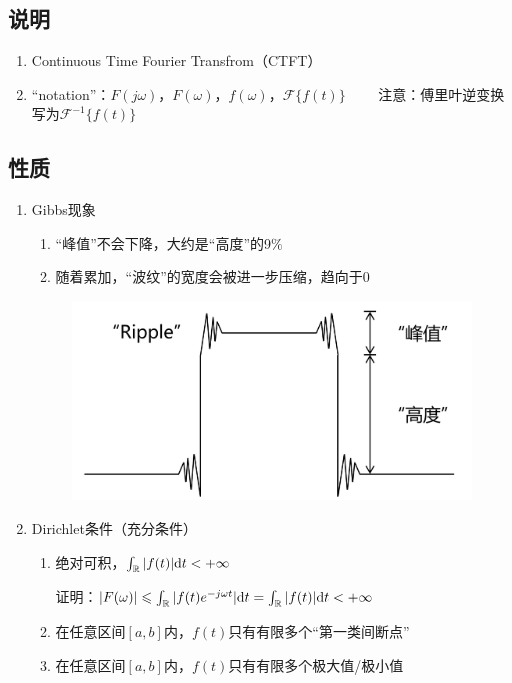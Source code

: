 \documentclass[UTF8]{ctexart}
\begin{document}
\subsection{说明}
\begin{enumerate}[label=(\arabic*),itemindent=0pt,labelindent=\parindent,labelwidth=2em,labelsep=5pt,leftmargin=*]
    \item Continuous Time Fourier Transfrom（CTFT）
    \item “notation”：$F(j\omega)$，$F(\omega)$，$\hat{f}(\omega)$，$\mathscr{F}\{f(t)\}\qquad$
          注意：傅里叶逆变换写为$\mathscr{F}^{-1}\{f(t)\}$
\end{enumerate}\par

\subsection{性质}
\begin{enumerate}[label=(\arabic*),itemindent=0pt,labelindent=\parindent,labelwidth=2em,labelsep=5pt,leftmargin=*]
    \item Gibbs现象
          \begin{enumerate}[label=\textcircled{\arabic*}]
            \item “峰值”不会下降，大约是“高度”的9$\%$
            \item 随着累加，“波纹”的宽度会被进一步压缩，趋向于0
          \end{enumerate}
          \begin{figure}[h]
            \centering
            \includegraphics[scale=0.35]{Gibbs.png}
          \end{figure}
    \item Dirichlet条件（充分条件）
          \begin{enumerate}[label=\textcircled{\arabic*}]
            \item 绝对可积，$\int_{\mathbb{R}}|f(t)|{\rm{d}}t<+\infty$\par
                  证明：$|F(\omega)|\leqslant\int_{\mathbb{R}}|f(t)e^{-j\omega{t}}|{\rm{d}}t=\int_{\mathbb{R}}|f(t)|{\rm{d}}t<+\infty$
            \item 在任意区间$[a,b]$内，$f(t)$只有有限多个“第一类间断点”
            \item 在任意区间$[a,b]$内，$f(t)$只有有限多个极大值/极小值
          \end{enumerate}
\end{enumerate}\par
\end{document}
